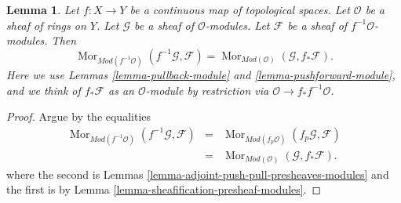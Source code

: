 \documentclass{stacks-project}
\theoremstyle{plain}
\newtheorem{lemma}[subsection]{Lemma}
\theoremstyle{definition}
\theoremstyle{remark}
\numberwithin{equation}{subsection}
\def\Mor{\mathop{\mathrm{Mor}}\nolimits}
\begin{document}
\begin{lemma}
\label{lemma-adjoint-push-pull-modules}
Let $f : X \to Y$ be a continuous map of topological spaces.
Let $\mathcal{O}$ be a sheaf of rings on $Y$.
Let $\mathcal{G}$ be a sheaf of $\mathcal{O}$-modules.
Let $\mathcal{F}$ be a sheaf of $f^{-1}\mathcal{O}$-modules.
Then
$$
\Mor_{\textit{Mod}(f^{-1}\mathcal{O})}(f^{-1}\mathcal{G}, \mathcal{F})
=
\Mor_{\textit{Mod}(\mathcal{O})}(\mathcal{G}, f_*\mathcal{F}).
$$
Here we use
Lemmas \ref{lemma-pullback-module}
and \ref{lemma-pushforward-module}, and we think of
$f_*\mathcal{F}$ as an $\mathcal{O}$-module by restriction via
$\mathcal{O} \to f_*f^{-1}\mathcal{O}$.
\end{lemma}

\begin{proof}
Argue by the equalities
\begin{eqnarray*}
\Mor_{\textit{Mod}(f^{-1}\mathcal{O})}(f^{-1}\mathcal{G}, \mathcal{F})
& = &
\Mor_{\textit{Mod}(f_p\mathcal{O})}(f_p\mathcal{G}, \mathcal{F}) \\
& = &
\Mor_{\textit{Mod}(\mathcal{O})}(\mathcal{G}, f_*\mathcal{F}).
\end{eqnarray*}
where the second is
Lemmas \ref{lemma-adjoint-push-pull-presheaves-modules}
and the first is by Lemma \ref{lemma-sheafification-presheaf-modules}.
\end{proof}
\end{document}

